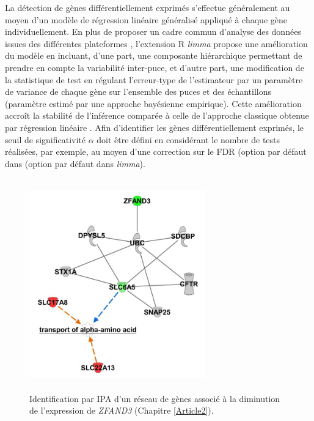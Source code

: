 \documentclass[11pt,a4paper,notrimn]{krantz}
\theoremstyle{definition}
\theoremstyle{definition}
\theoremstyle{remark}
\begin{document}
La détection de gènes différentiellement exprimés s'effectue
généralement au moyen d'un modèle de régression linéaire généralisé
appliqué à chaque gène individuellement. En plus de proposer un cadre
commun d'analyse des données issues des différentes plateformes
\citep{R-limma}, l'extension R \emph{limma} propose une amélioration du
modèle en incluant, d'une part, une composante hiérarchique permettant
de prendre en compte la variabilité inter-puce, et d'autre part, une
modification de la statistique de test en régulant l'erreur-type de
l'estimateur par un paramètre de variance de chaque gène sur l'ensemble
des puces et des échantillons (paramètre estimé par une approche
bayésienne empirique). Cette amélioration accroît la stabilité de
l'inférence comparée à celle de l'approche classique obtenue par
régression linéaire \citep{smyth_linear_2004, phipson_robust_2016}. Afin
d'identifier les gènes différentiellement exprimés, le seuil de
significativité \(\alpha\) doit être défini en considérant le nombre de
tests réalisées, par exemple, au moyen d'une correction sur le FDR
(option par défaut dans (option par défaut dans \emph{limma}).





\begin{figure}[!htb]

{\centering \includegraphics[width=3in,height=3.6in]{FiguresTables/networkIPA} 

}

\caption{Identification par IPA d'un réseau de gènes associé à
la diminution de l'expression de \emph{ZFAND3} (Chapitre
\ref{Article2}).}\label{fig:networkIPA}
\end{figure}
\end{document}
